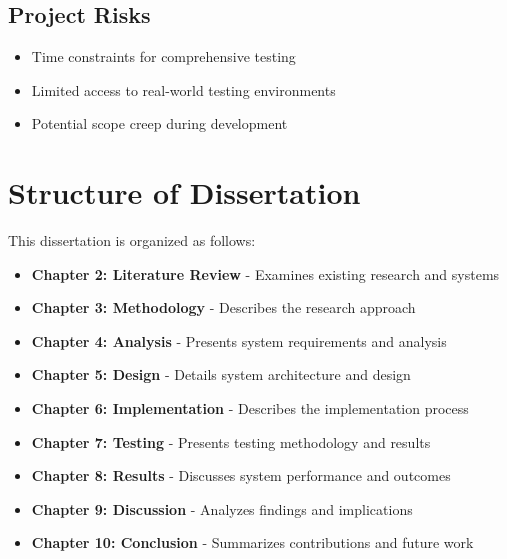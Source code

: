 \subsection{Project Risks}
\begin{itemize}
    \item Time constraints for comprehensive testing
    \item Limited access to real-world testing environments
    \item Potential scope creep during development
\end{itemize}

\section{Structure of Dissertation}

This dissertation is organized as follows:

\begin{itemize}
    \item \textbf{Chapter 2: Literature Review} - Examines existing research and systems
    \item \textbf{Chapter 3: Methodology} - Describes the research approach
    \item \textbf{Chapter 4: Analysis} - Presents system requirements and analysis
    \item \textbf{Chapter 5: Design} - Details system architecture and design
    \item \textbf{Chapter 6: Implementation} - Describes the implementation process
    \item \textbf{Chapter 7: Testing} - Presents testing methodology and results
    \item \textbf{Chapter 8: Results} - Discusses system performance and outcomes
    \item \textbf{Chapter 9: Discussion} - Analyzes findings and implications
    \item \textbf{Chapter 10: Conclusion} - Summarizes contributions and future work
\end{itemize}
